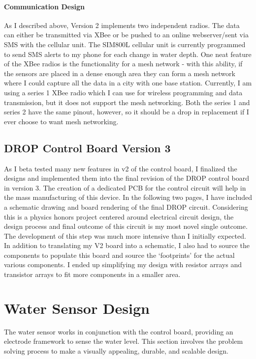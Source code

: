 \documentclass[letter]{article}
\begin{document}
\paragraph{Communication Design} As I described above, Version 2 implements two independent radios. The data can either be transmitted via XBee or be pushed to an online webserver/sent via SMS with the cellular unit. The SIM800L cellular unit is currently programmed to send SMS alerts to my phone for each change in water depth. One neat feature of the XBee radios is the functionality for a mesh network - with this ability, if the sensors are placed in a dense enough area they can form a mesh network where I could capture all the data in a city with one base station. Currently, I am using a series 1 XBee radio which I can use for wireless programming and data transmission, but it does not support the mesh networking. Both the series 1 and series 2 have the same pinout, however, so it should be a drop in replacement if I ever choose to want mesh networking. 

\subsection{DROP Control Board Version 3}
As I beta tested many new features in v2 of the control board, I finalized the designs and implemented them into the final revision of the DROP control board in version 3. The creation of a dedicated PCB for the control circuit will help in the mass manufacturing of this device. In the following two pages, I have included a schematic drawing and board rendering of the final DROP circuit. Considering this is a physics honors project centered around electrical circuit design, the design process and final outcome of this circuit is my most novel single outcome. The development of this step was much more intensive than I initially expected. In addition to translating my V2 board into a schematic, I also had to source the components to populate this board and source the `footprints’ for the actual various components. I ended up simplifying my design with resistor arrays and transistor arrays to fit more components in a smaller area.






\section{Water Sensor Design}
The water sensor works in conjunction with the control board, providing an electrode framework to sense the water level. This section involves the problem solving process to make a visually appealing, durable, and scalable design.
\end{document}

